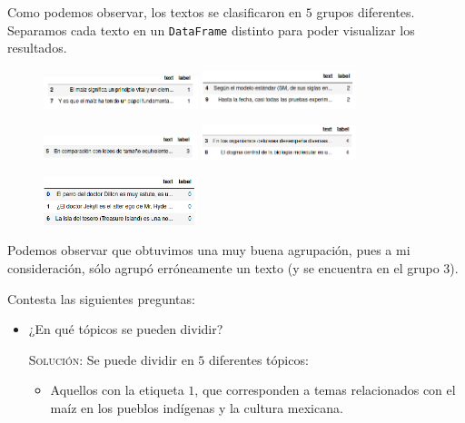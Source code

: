 \documentclass[letterpaper,11pt]{article}
\begin{document}
\begin{enumerate}
    Como podemos observar, los textos se clasificaron en $5$ grupos diferentes. 
    Separamos cada texto en un \texttt{DataFrame} distinto para poder visualizar 
    los resultados.
    \begin{figure}[ht]
        \centering
        {{\includegraphics[width=0.4\textwidth]{imagenes/text7.png}}}%
        \qquad
        {{\includegraphics[width=0.4\textwidth]{imagenes/text8.png}}}%
    \end{figure}
    \begin{figure}[ht]
        \centering
        {{\includegraphics[width=0.4\textwidth]{imagenes/text9.png}}}%
        \qquad
        {{\includegraphics[width=0.4\textwidth]{imagenes/text10.png}}}%
    \end{figure}
    \begin{figure}[ht]
        \centering
        \includegraphics[width=0.4\textwidth]{imagenes/text6.png}
    \end{figure}

    Podemos observar que obtuvimos una muy buena agrupación, pues a mi 
    consideración, sólo agrupó erróneamente un texto (y se encuentra en el 
    grupo $3$).
    
    \newpage
    Contesta las siguientes preguntas:
    \begin{itemize}
        \item ¿En qué tópicos se pueden dividir?

        \textsc{Solución:} Se puede dividir en $5$ diferentes tópicos:
        \begin{itemize}
            \item Aquellos con la etiqueta $1$, que corresponden a temas 
            relacionados con el maíz en los pueblos indígenas y la cultura 
            mexicana.


\end{itemize}
\end{itemize}
\end{enumerate}
\end{document}
